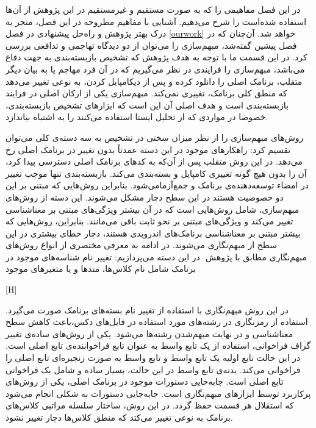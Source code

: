 
\label{premliminaries}
در این فصل مفاهیمی را که به صورت مستقیم و غیرمستقیم در این پژوهش از آن‌ها استفاده شده‌است را شرح ‌می‌دهیم. آشنایی با مفاهیم مطروحه در این فصل، منجر به درک بهتر پژوهش و راه‌حل پیشنهادی در فصل 
\ref{ourwork}
خواهد شد.
آن‌چنان که در فصل پیشین گفته‌شد، مبهم‌سازی را می‌توان از دو دیدگاه تهاجمی و تدافعی بررسی کرد. در این قسمت ما با توجه به هدف پژوهش که تشخیص بازبسته‌بندی به جهت دفاع می‌باشد، مبهم‌سازی را فرایندی در نظر می‌گیریم که در آن فرد مهاجم یا به بیان دیگر متقلب، برنامک اصلی را دانلود کرده و پس از دیکامپایل کردن، به نوعی تغییر می‌دهد که منطق کلی برنامک، تغییری نمی‌کند. مبهم‌سازی یکی از ارکان اصلی در فرایند بازبسته‌بندی ‌است و هدف اصلی آن این است که ابزار‌های تشخیص بازبسته‌بندی، خصوصا در مواردی که از تحلیل ایستا استفاده می‌کنند را به اشتباه بیاندازد.

روش‌های مبهم‌سازی را از نظر میزان سختی در تشخیص به سه دسته‌ی کلی می‌توان تقسیم کرد: 
راهکار‌های موجود در این دسته عمدتاً بدون تغییر در برنامک اصلی رخ می‌دهد. در این روش متقلب پس از آن‌که به کد‌های برنامک اصلی دسترسی پیدا کرد، آن را بدون هیچ گونه تغییری کامپایل و بسته‌بندی می‌کند‌. بازبسته‌بندی تنها موجب تغییر در امضا‌ء توسعه‌دهنده‌ی برنامک  و جمع‌آزمامی‌شود. بنابراین روش‌هایی که مبتنی بر این دو خصوصیت هستند در این سطح دچار مشکل می‌شوند.
\label{miani}
این دسته از روش‌های مبهم‌سازی، شامل روش‌هایی است که در آن بیشتر ویژگی‌های مبتنی بر معناشناسی تغییر می‌کند و ویژگی‌های مبتنی بر نحو ثابت باقی می‌مانند. بنابراین، روش‌هایی که بیشتر مبتنی بر معنا‌شناسی برنامک‌های اندرویدی هستند، دچار خطای بیشتری در این سطح از مبهم‌نگاری می‌شوند. در ادامه به معرفی مختصری از انواع روش‌های مبهم‌نگاری مطابق با پژوهش  ‌ در این دسته می‌پردازیم:
  تغییر نام شناسه‌های موجود در برنامک شامل نام کلاس‌ها، متد‌ها و یا متغیر‌های موجود 


[H]
\vspace{1em}

  در این روش مبهم‌نگاری با استفاده از تغییر نام بسته‌های برنامک صورت می‌گیرد.
  استفاده از رمز‌نگاری در رشته‌های مورد استفاده در فایل‌های دکس،باعث کاهش سطح معناشناسی و در نهایت مبهم‌شدن رشته‌ها می‌شود. 
  یکی از روش‌های ساده‌ی تغییر گراف فراخوانی، استفاده از یک تابع واسط به عنوان تابع فراخواننده‌ی تابع اصلی است. در این حالت تابع اولیه یک تابع واسط و تابع واسط به صورت زنجیر‌ه‌ای تابع اصلی را فراخوانی می‌کند. بدنه‌ی تابع واسط در این حالت، بسیار ساده و شامل یک فراخوانی تابع اصلی‌ است.
  جابه‌حایی دستورات موجود در برنامک اصلی، یکی از روش‌های پرکاربرد توسط ایزار‌های مبهم‌نگاری است. جابه‌جایی دستورات به شکلی انجام می‌شود که استقلال هر قسمت حفظ گردد.
  در این روش، ساختار سلسله مراتبی کلاس‌های برنامک به نوعی تغییر می‌کتد که منطق کلاس‌ها دچار تغییر نشود.


